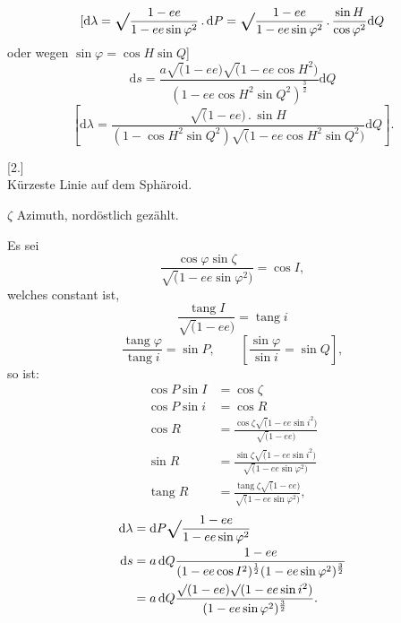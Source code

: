 \par\clearpage
\noindent{}\makebox[12mm][r]{}\par\medskip

\[
[\mathrm d\lambda=\ixrad\frac{1-ee}{1-ee\sin\varphi^2}\,.\,\mathrm dP
=\ixrad\frac{1-ee}{1-ee\sin\varphi^2}\,.\,\frac{\sin H}{\cos\varphi^2}\mathrm dQ
\]
\noindent oder wegen \(\sin\varphi=\cos H\sin Q\)]
\[
\mathrm ds=\frac{a\surd(1-ee)\surd(1-ee\cos H^2)}
{(1-ee\cos H^2\sin Q^2)^{\frac32}}\mathrm dQ
\]
\[
\left[\mathrm d\lambda=\frac{\surd(1-ee)\,.\,\sin H}
{(1-\cos H^2\sin Q^2)\surd(1-ee\cos H^2\sin Q^2)}\mathrm dQ\right].
\]

\bigskip
\begin{center}
[2.]\\[.5ex]
Kürzeste Linie auf dem Sphäroid.
\end{center}

\(\zeta\) Azimuth, nordöstlich gezählt.

Es sei
\[
\frac{\cos\varphi\sin\zeta}{\surd(1-ee\sin\varphi^2)}=\cos I,
\]
\noindent welches constant ist,
\[
\frac{\operatorname{tang}I}{\surd(1-ee)}=\operatorname{tang}i
\]
\[
\frac{\operatorname{tang}\varphi}{\operatorname{tang}i}=\sin P,\qquad
\left[\frac{\sin\varphi}{\sin i}=\sin Q\right],
\]
\noindent so ist:
\[
\begin{aligned}
\cos P\sin I&=\cos\zeta\\
\cos P\sin i&=\cos R\\
\cos R&=\frac{\cos\zeta\surd(1-ee\sin i^2)}{\surd(1-ee)}\\
\sin R&=\frac{\sin\zeta\surd(1-ee\sin i^2)}{\surd(1-ee\sin\varphi^2)}\\
\operatorname{tang}R&=\frac{\operatorname{tang}\zeta\surd(1-ee)}{\surd(1-ee\sin\varphi^2)},
\end{aligned}
\]
\[
\begin{aligned}
\mathrm d\lambda&=\mathrm dP\ixrad\frac{1-ee}{1-ee\sin\varphi^2}\\
\mathrm ds&=a\,\mathrm dQ\frac{1-ee}{(1-ee\cos I^2)^{\frac12}(1-ee\sin\varphi^2)^{\frac32}}\\
&=a\,\mathrm dQ\frac{\surd(1-ee)\surd(1-ee\sin i^2)}
{(1-ee\sin\varphi^2)^{\frac32}}.
\end{aligned}
\]

\par\clearpage
\noindent\makebox[12mm][l]{}\par\medskip

